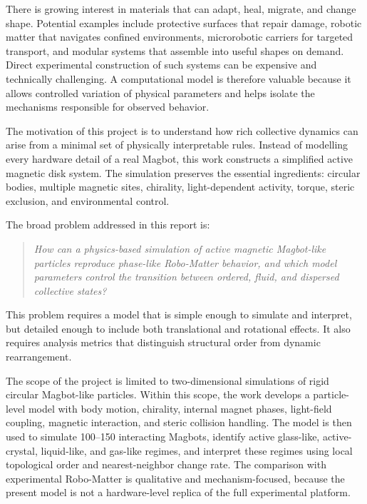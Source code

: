 \documentclass[12pt,a4paper,oneside]{report}
\begin{document}
There is growing interest in materials that can adapt, heal, migrate, and change shape. Potential examples include protective surfaces that repair damage, robotic matter that navigates confined environments, microrobotic carriers for targeted transport, and modular systems that assemble into useful shapes on demand. Direct experimental construction of such systems can be expensive and technically challenging. A computational model is therefore valuable because it allows controlled variation of physical parameters and helps isolate the mechanisms responsible for observed behavior.

The motivation of this project is to understand how rich collective dynamics can arise from a minimal set of physically interpretable rules. Instead of modelling every hardware detail of a real Magbot, this work constructs a simplified active magnetic disk system. The simulation preserves the essential ingredients: circular bodies, multiple magnetic sites, chirality, light-dependent activity, torque, steric exclusion, and environmental control.

The broad problem addressed in this report is:

\begin{quote}
\textit{How can a physics-based simulation of active magnetic Magbot-like particles reproduce phase-like Robo-Matter behavior, and which model parameters control the transition between ordered, fluid, and dispersed collective states?}
\end{quote}

This problem requires a model that is simple enough to simulate and interpret, but detailed enough to include both translational and rotational effects. It also requires analysis metrics that distinguish structural order from dynamic rearrangement.

The scope of the project is limited to two-dimensional simulations of rigid circular Magbot-like particles. Within this scope, the work develops a particle-level model with body motion, chirality, internal magnet phases, light-field coupling, magnetic interaction, and steric collision handling. The model is then used to simulate 100--150 interacting Magbots, identify active glass-like, active-crystal, liquid-like, and gas-like regimes, and interpret these regimes using local topological order and nearest-neighbor change rate. The comparison with experimental Robo-Matter is qualitative and mechanism-focused, because the present model is not a hardware-level replica of the full experimental platform.
\end{document}
